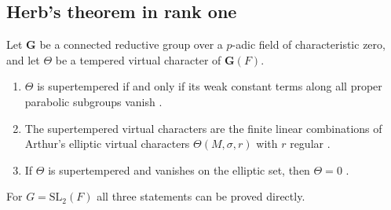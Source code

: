 \subsection{Herb's theorem in rank one}\label{sub:herb}
\begin{theorem}\label{thm:herb}
Let $\mathbf G$ be a connected reductive group over a $p$-adic field of characteristic zero, and let $\Theta$ be a tempered virtual character of $\mathbf G(F)$.
\begin{enumerate}[label=(\alph*),leftmargin=*]
\item $\Theta$ is supertempered if and only if its weak constant terms along all proper parabolic subgroups vanish \cite[Theorem 2.5]{He94}.
\item The supertempered virtual characters are the finite linear combinations of Arthur's elliptic virtual characters $\Theta(M,\sigma,r)$ with $r$ regular \cite[Theorem 3.1]{He94}.
\item If $\Theta$ is supertempered and vanishes on the elliptic set, then $\Theta=0$ \cite[Theorem 3.2]{He94}.
\end{enumerate}
\end{theorem}
For $G=\mathrm{SL}_2(F)$ all three statements can be proved directly.

